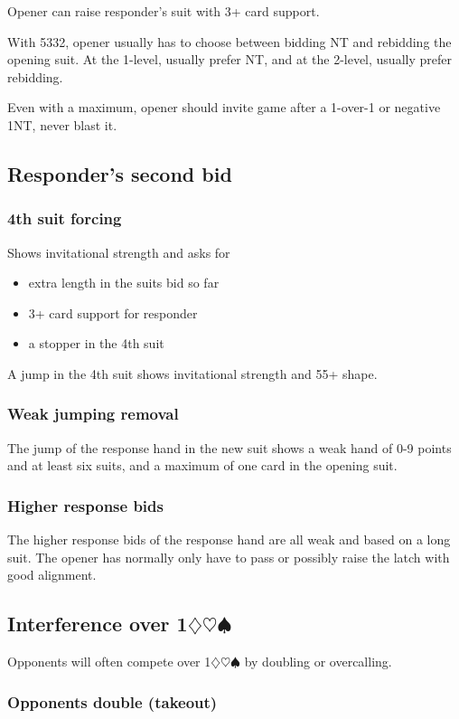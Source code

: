 \documentclass[a4paper, twoside, 11pt]{article}
\begin{document}
\begin{multicols}{3}
Opener can raise responder's suit with 3+ card support.

With 5332, opener usually has to choose between bidding NT and rebidding the opening suit. At the 1-level, usually prefer NT, and at the 2-level, usually prefer rebidding.

Even with a maximum, opener should invite game after a 1-over-1 or negative 1NT, never blast it.

\subsection*{Responder's second bid}

\subsubsection*{4th suit forcing}
Shows invitational strength and asks for \begin{itemize}
    \item extra length in the suits bid so far
    \item 3+ card support for responder
    \item a stopper in the 4th suit
\end{itemize}

A jump in the 4th suit shows invitational strength and 55+ shape.

\subsubsection*{Weak jumping removal}
The jump of the response hand in the new suit shows a weak
hand of 0-9 points and at least six suits, and
a maximum of one card in the opening suit.


\subsubsection*{Higher response bids}
The higher response bids of the response hand are all weak and
based on a long suit. The opener has
normally only have to pass or possibly raise
the latch with good alignment.

\subsection*{Interference over 1$\diamondsuit\heartsuit\spadesuit$}
Opponents will often compete over 1$\diamondsuit\heartsuit\spadesuit$ by doubling or overcalling.

\subsubsection*{Opponents double (takeout)}


\end{multicols}
\end{document}
